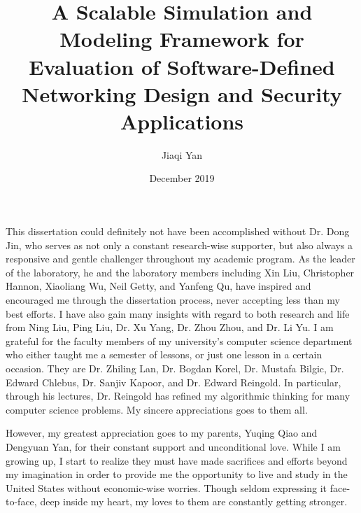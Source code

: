 \documentclass{iitthesis}
\theoremstyle{definition}
\begin{document}
\title{A Scalable Simulation and Modeling Framework for Evaluation of
Software-Defined Networking Design and Security Applications
}
\author{Jiaqi Yan}
\date{December 2019}
\maketitle                %


\prelimpages         %


\begin{acknowledgement}
\par  This dissertation could definitely not have been accomplished without Dr. Dong Jin,
who serves as not only a constant research-wise supporter,
but also always a responsive and gentle challenger throughout my academic program.
As the leader of the laboratory, he and the laboratory members including Xin Liu, Christopher Hannon, Xiaoliang Wu, Neil Getty, and Yanfeng Qu,
have inspired and encouraged me through the dissertation process, never accepting less than my best efforts.
I have also gain many insights with regard to both research and life from Ning Liu, Ping Liu, Dr. Xu Yang, Dr. Zhou Zhou, and Dr. Li Yu.
I am grateful for the faculty members of my university's computer science department
who either taught me a semester of lessons, or just one lesson in a certain occasion.
They are Dr. Zhiling Lan, Dr. Bogdan Korel, Dr. Mustafa Bilgic, Dr. Edward Chlebus, Dr. Sanjiv Kapoor, and Dr. Edward Reingold.
In particular, through his lectures, Dr. Reingold has refined my algorithmic thinking for many computer science problems.
My sincere appreciations goes to them all.

However, my greatest appreciation goes to my parents,
Yuqing Qiao and Dengyuan Yan, for their constant support and unconditional love.
While I am growing up, I start to realize they must have made sacrifices and efforts beyond my imagination
in order to provide me the opportunity to live and study in the United States without economic-wise worries.
Though seldom expressing it face-to-face, deep inside my heart, my loves to them are constantly getting stronger.
\end{acknowledgement}
\end{document}
